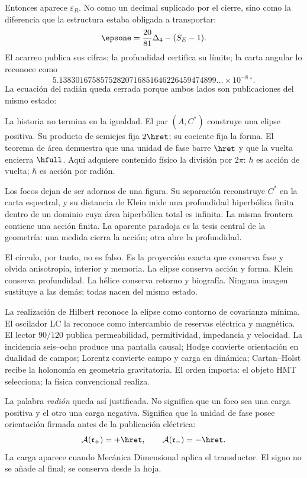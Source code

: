 Entonces aparece \(\varepsilon_R\). No como un decimal suplicado por el
cierre, sino como la diferencia que la estructura estaba obligada a
transportar:
\[
\epsone=\frac{20}{81}\Delta_4-(S_E-1).
\]
El acarreo publica sus cifras; la profundidad certifica su límite; la carta
angular lo reconoce como
\[
5.13830167585752820716851646226459474899\ldots
\times10^{-8}\,{}^\circ.
\]
La ecuación del radián queda cerrada porque ambos lados son publicaciones del
mismo estado:
\BigRadionEquation

La historia no termina en la igualdad. El par \((A,C^*)\) construye una
elipse positiva. Su producto de semiejes fija \(2\hret\); su cociente fija la
forma. El teorema de área demuestra que una unidad de fase barre \(\hret\) y
que la vuelta encierra \(\hfull\). Aquí adquiere contenido físico la división
por \(2\pi\): \(h\) es acción de vuelta; \(\hbar\) es acción por radión.

Los focos dejan de ser adornos de una figura. Su separación reconstruye
\(C^*\) en la carta espectral, y su distancia de Klein mide una profundidad
hiperbólica finita dentro de un dominio cuya área hiperbólica total es
infinita. La misma frontera contiene una acción finita. La aparente paradoja
es la tesis central de la geometría: una medida cierra la acción; otra abre la
profundidad.

El círculo, por tanto, no es falso. Es la proyección exacta que conserva fase
y olvida anisotropía, interior y memoria. La elipse conserva acción y forma.
Klein conserva profundidad. La hélice conserva retorno y biografía. Ninguna
imagen sustituye a las demás; todas nacen del mismo estado.

La realización de Hilbert reconoce la elipse como contorno de covarianza
mínima. El oscilador LC la reconoce como intercambio de reservas eléctrica y
magnética. El lector \(90/120\) publica permeabilidad, permitividad,
impedancia y velocidad. La incidencia seis--ocho produce una pantalla causal;
Hodge convierte orientación en dualidad de campos; Lorentz convierte campo y
carga en dinámica; Cartan--Holst recibe la holonomía en geometría
gravitatoria. El orden importa: el objeto HMT selecciona; la física
convencional realiza.

La palabra \emph{radión} queda así justificada. No significa que un foco sea
una carga positiva y el otro una carga negativa. Significa que la unidad de
fase posee orientación firmada antes de la publicación eléctrica:
\[
\mathcal A(\mathfrak r_+)=+\hret,
\qquad
\mathcal A(\mathfrak r_-)=-\hret.
\]
La carga aparece cuando Mecánica Dimensional aplica el transductor. El signo
no se añade al final; se conserva desde la hoja.

